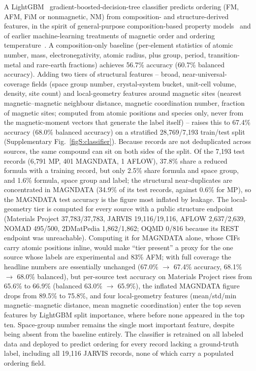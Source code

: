 \documentclass[aps,prb,preprint,superscriptaddress,longbibliography,nofootinbib]{revtex4-2}
\begin{document}
A LightGBM~\cite{ke2017} gradient-boosted-decision-tree classifier predicts ordering (FM, AFM, FiM or nonmagnetic, NM) from
composition- and structure-derived features, in the spirit of general-purpose composition-based property
models~\cite{ward2016,schmidt2019} and of earlier machine-learning treatments of magnetic order and ordering
temperature~\cite{nelson2019,court2020,frey2020,kabiraj2020}. A composition-only baseline (per-element
statistics of atomic number, mass, electronegativity, atomic radius, plus group, period, transition-metal and rare-earth
fractions) achieves 56.7\% accuracy (60.7\% balanced accuracy). Adding two tiers of structural features --
broad, near-universal-coverage fields (space group number, crystal-system bucket, unit-cell volume, density,
site count) and local-geometry features around magnetic sites (nearest magnetic--magnetic neighbour distance,
magnetic coordination number, fraction of magnetic sites; computed from atomic positions and species only,
never from the magnetic-moment vectors that generate the label itself) -- raises this to 67.4\% accuracy
(68.0\% balanced accuracy) on a stratified 28{,}769/7{,}193 train/test split (Supplementary
Fig.~\ref{figS:classifier}). Because records are not deduplicated across sources, the same compound can sit
on both sides of the split. Of the 7{,}193 test records (6{,}791 MP, 401 MAGNDATA, 1 AFLOW), 37.8\% share a
reduced formula with a training record, but only 2.5\% share formula and space group, and 1.6\% formula, space
group and label; the structural near-duplicates are concentrated in MAGNDATA (34.9\% of its test records, against
0.6\% for MP), so the MAGNDATA test accuracy is the figure most inflated by leakage. The local-geometry tier is computed for every source with a public structure
endpoint (Materials Project 37{,}783/37{,}783, JARVIS 19{,}116/19{,}116, AFLOW 2{,}637/2{,}639, NOMAD
495/500, 2DMatPedia 1{,}862/1{,}862; OQMD 0/816 because its REST endpoint was unreachable). Computing it for
MAGNDATA alone, whose CIFs carry atomic positions inline, would make ``tier present'' a proxy for the one
source whose labels are experimental and 83\% AFM; with full coverage the headline numbers are essentially
unchanged (67.0\% $\to$ 67.4\% accuracy, 68.1\% $\to$ 68.0\% balanced), but per-source test accuracy on
Materials Project rises from 65.6\% to 66.9\% (balanced 63.0\% $\to$ 65.9\%), the inflated MAGNDATA figure
drops from 89.5\% to 75.8\%, and four local-geometry features (mean/std/min magnetic--magnetic distance, mean
magnetic coordination) enter the top seven features by LightGBM split importance, where before none appeared
in the top ten. Space-group number remains the single most important feature, despite being absent from the
baseline entirely. The classifier is retrained on all labeled data and deployed to predict ordering for every
record lacking a ground-truth label, including all 19{,}116 JARVIS records, none of which carry a populated
ordering field.
\end{document}
